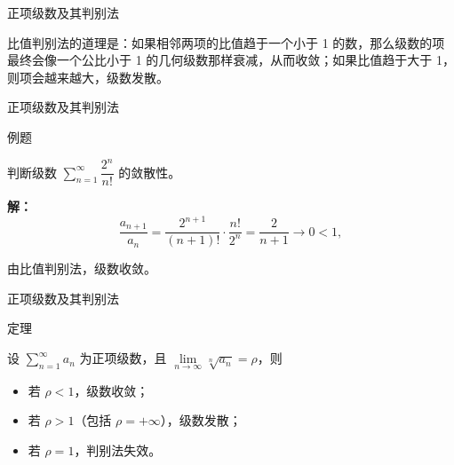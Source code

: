 \documentclass[aspectratio=169,10pt,fontset=fandol]{ctexbeamer}
\begin{document}
\begin{frame}[t,fragile]{正项级数及其判别法}
\normalsize
{\normalsize
比值判别法的道理是：如果相邻两项的比值趋于一个小于 1 的数，那么级数的项最终会像一个公比小于 1 的几何级数那样衰减，从而收敛；如果比值趋于大于 1，则项会越来越大，级数发散。


}
\end{frame}
\begin{frame}[t,fragile]{正项级数及其判别法}
\normalsize
\begin{block}{例题}
{\normalsize
判断级数 \(\sum\limits_{n = 1}^{  \infty } \dfrac{2^n}{n!}\) 的敛散性。


}
\end{block}
\pause
{\normalsize
\textbf{解：}
\[

\dfrac{a_{n+1}}{a_n} = \dfrac{2^{n+1}}{(n+1)!} \cdot \dfrac{n!}{2^n} = \dfrac{2}{n+1} \to 0 < 1,

\]

由比值判别法，级数收敛。


}
\end{frame}
\begin{frame}[t,fragile]{正项级数及其判别法}
\normalsize
\begin{block}{定理}
{\normalsize


设 \(\sum\limits_{n = 1}^{  \infty } a_n\) 为正项级数，且 \(\lim\limits_{n\to\infty} \sqrt[n]{a_n} = \rho\)，则

\begin{itemize}

\item 若 \(\rho < 1\)，级数收敛；

\item 若 \(\rho > 1\)（包括 \(\rho = +\infty\)），级数发散；

\item 若 \(\rho = 1\)，判别法失效。

\end{itemize}


}
\end{block}
\end{frame}
\end{document}
